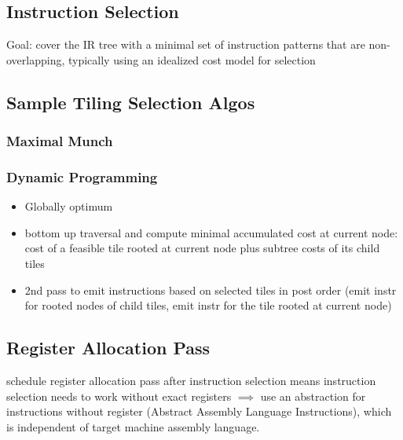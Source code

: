 \documentclass[8pt]{extarticle}
\begin{document}
\begin{multicols*}{2}
  \section{Instruction Selection}

  Goal: cover the IR tree with a minimal set of instruction patterns that are non-overlapping, typically using an idealized cost model for selection
  
  \subsection{Sample Tiling Selection Algos}
  \subsubsection{Maximal Munch}

  \subsubsection{Dynamic Programming}

  \begin{itemize}
  \item Globally optimum
  \item bottom up traversal and compute minimal accumulated cost at current node: cost of a feasible tile rooted at current node plus subtree costs of its child tiles
  \item 2nd pass to emit instructions based on selected tiles in post order (emit instr for rooted nodes of child tiles, emit instr for the tile rooted at current node)
  \end{itemize}

  \subsection{Register Allocation Pass}
  schedule register allocation pass after instruction selection means instruction selection needs to work without exact registers $\implies$ use an abstraction for instructions without register (Abstract Assembly Language Instructions), which is independent of target machine assembly language.


\end{multicols*}
\end{document}

